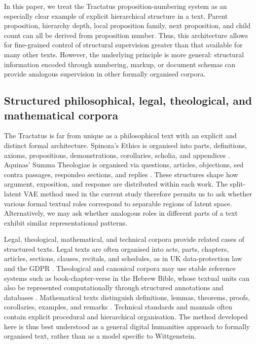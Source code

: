 \documentclass[webpdf,modern,medium,namedate]{oup-authoring-template}
\begin{document}
In this paper, we treat the Tractatus proposition-numbering system as an especially clear example of explicit hierarchical structure in a text. Parent proposition, hierarchy depth, local proposition family, next proposition, and child count can all be derived from proposition number. Thus, this architecture allows for fine-grained control of structural supervision greater than that available for many other texts. However, the underlying principle is more general: structural information encoded through numbering, markup, or document schemas can provide analogous supervision in other formally organised corpora.

\subsection{Structured philosophical, legal, theological, and mathematical corpora}
The Tractatus is far from unique as a philosophical text with an explicit and distinct formal architecture. Spinoza’s Ethics is organised into parts, definitions, axioms, propositions, demonstrations, corollaries, scholia, and appendices \citep{spinoza1996ethics}. Aquinas’ Summa Theologiae is organised via questions, articles, objections, sed contra passages, respondeo sections, and replies \citep{aquinas1964summa}. These structures shape how argument, exposition, and response are distributed within each work. The split-latent VAE method used in the current study therefore permits us to ask whether various formal textual roles correspond to separable regions of latent space. Alternatively, we may ask whether analogous roles in different parts of a text exhibit similar representational patterns.

Legal, theological, mathematical, and technical corpora provide related cases of structured texts. Legal texts are often organised into acts, parts, chapters, articles, sections, clauses, recitals, and schedules, as in UK data-protection law \citeyearpar{uk2018dataprotection} and the GDPR \citeyearpar{eu2016gdpr}. Theological and canonical corpora may use stable reference systems such as book-chapter-verse in the Hebrew Bible, whose textual units can also be represented computationally through structured annotations and databases \citep{elliger1997bhs,roorda2017hebrew}. Mathematical texts distinguish definitions, lemmas, theorems, proofs, corollaries, examples, and remarks \citep{euclid1926elements,newton1999principia}. Technical standards and manuals often contain explicit procedural and hierarchical organisation. The method developed here is thus best understood as a general digital humanities approach to formally organised text, rather than as a model specific to Wittgenstein.
\end{document}

